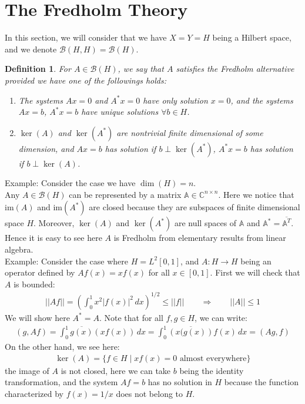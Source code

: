 \documentclass[11pt]{book}
\theoremstyle{break}
\theoremstyle{break}
\newtheorem{defn}{Definition}[corL]
\newcommand{\C}{\mathbb{C}}
\newcommand{\im}{\text{im}}
\newcommand{\example}{\color{green}Example: \color{black}}
\begin{document}
\newpage
\section[The Fredholm Theory]{\color{red} The Fredholm Theory\color{black}}
In this section, we will consider that we have $X = Y =H$ being a Hilbert space, and we denote $\mathcal{B}(H,H) = \mathcal{B}(H)$.\\

\begin{defn}
For $A \in \mathcal{B}(H)$, we say that $A$ satisfies the Fredholm alternative provided we have one of the followings holds:
\begin{enumerate}[topsep=3pt,itemsep=-1ex,partopsep=1ex,parsep=1ex]
\item The systems $Ax = 0$ and $A^* x =0$ have only solution $x = 0$, and the systems $Ax = b$, $A^*x = b$ have unique solutions $\forall b \in H$.
\item  $\ker(A)$ and $\ker(A^*)$ are nontrivial finite dimensional of some dimension, and $Ax = b$ has solution if $b \perp \ker(A^*)$, $A^*x =b$ has solution if $b\perp \ker(A)$. 
\end{enumerate}
\end{defn}

\example Consider the case we have $\dim(H) = n$. \\
Any $A \in \mathcal{B}(H)$ can be represented by a matrix $\mathbb{A}\in \C^{n\times n}$. Here we notice that $\im(A)$ and $\im(A^*)$ are closed because they are subspaces of finite dimensional space $H$. Moreover, $\ker(A)$ and $\ker(A^*)$ are null spaces of $\mathbb{A}$ and $\mathbb{A}^* = \overline{\mathbb{A}^T}$. Hence it is easy to see here $A$ is Fredholm from elementary results from linear algebra. \\


\example Consider the case where $H = L^2[0,1]$, and $A:H \to H$ being an operator defined by $Af(x) = xf(x)$ for all $x \in [0,1]$. First we will check that $A$ is bounded:
\begin{align*}
||Af|| = \left( \int_0^1 x^2 |f(x)|^2 \, dx \right)^{1/2} \leq ||f|| \qquad \Rightarrow \qquad ||A||\leq 1
\end{align*}
We will show here $A^* = A$. Note that for all $f,g \in H$, we can write:
\begin{align*}
(g,Af) = \int_0^1 \overline{g(x)}\left( x f(x)\right) \, dx = \int_0^1 \overline{\left(x(g(x)\right)}f(x)\, dx = (Ag, f)
\end{align*}
On the other hand, we see here:
\begin{align*}
\ker(A) = \{ f\in H \mid xf(x) = 0 \text{ almost everywhere}\}
\end{align*}
the image of $A$ is not closed, here we can take $b$ being the identity transformation, and the system $Af = b$ has no solution in $H$ because the function characterized by $f(x) = 1/x$ does not belong to $H$. \\
\end{document}
